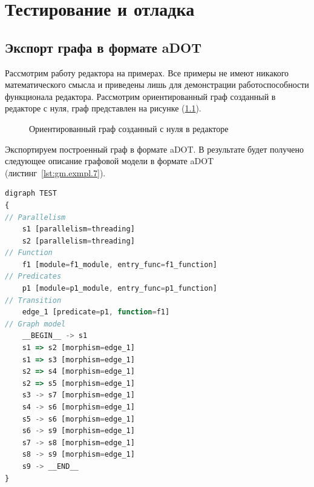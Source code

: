 \chapter{Тестирование и отладка}\label{chap4_soft_testing}

\section{Экспорт графа в формате aDOT}
Рассмотрим работу редактора на примерах. Все примеры не имеют никакого математического смысла и приведены лишь для демонстрации работоспособности функционала редактора. Рассмотрим ориентированный граф созданный в редакторе с нуля, граф представлен на рисунке (\ref{fig:example_1}).

\begin{figure}[ht!]
\caption{Ориентированный граф созданный с нуля в редакторе}
\label{fig:example_1}
\end{figure}

Экспортируем построенный граф в формате aDOT. В результате будет получено следующее описание графовой модели в формате aDOT (листинг~\ref{lst:gm.exmpl.7}).

\begin{lstlisting}[label={lst:gm.exmpl.7}, caption={Полученное описание графовой модели (\ref{fig:example_1}) в формате aDOT}, language=JavaScript]
digraph TEST
{
// Parallelism
	s1 [parallelism=threading]
	s2 [parallelism=threading]
// Function
	f1 [module=f1_module, entry_func=f1_function]
// Predicates
	p1 [module=p1_module, entry_func=p1_function]
// Transition
	edge_1 [predicate=p1, function=f1]
// Graph model
	__BEGIN__ -> s1
	s1 => s2 [morphism=edge_1]
	s1 => s3 [morphism=edge_1]
	s2 => s4 [morphism=edge_1]
	s2 => s5 [morphism=edge_1]
	s3 -> s7 [morphism=edge_1]
	s4 -> s6 [morphism=edge_1]
	s5 -> s6 [morphism=edge_1]
	s6 -> s9 [morphism=edge_1]
	s7 -> s8 [morphism=edge_1]
	s8 -> s9 [morphism=edge_1]
	s9 -> __END__ 
}
\end{lstlisting}

